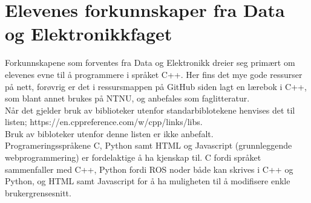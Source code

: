 \section*{Elevenes forkunnskaper fra Data og Elektronikkfaget} \label{Sec: KoordDataEl}

    Forkunnskapene som forventes fra Data og Elektronikk dreier seg primært om elevenes evne til å programmere i språket C++.
    Her fins det mye gode ressurser på nett, forøvrig er det i ressursmappen på GitHub siden lagt en lærebok i C++, som blant annet brukes på NTNU, og anbefales som faglitteratur.\\
    Når det gjelder bruk av biblioteker utenfor standarbiblotekene henvises det til listen; https://en.cppreference.com/w/cpp/links/libs.\\
    Bruk av bibloteker utenfor denne listen er ikke anbefalt.\\
    Programeringsspråkene C, Python samt HTML og Javascript (grunnleggende webprogrammering) er fordelaktige å ha kjenskap til. C fordi språket sammenfaller med C++, Python fordi ROS noder både kan skrives i C++ og Python, og HTML samt Javascript for å ha muligheten til å modifisere enkle brukergrensesnitt.
